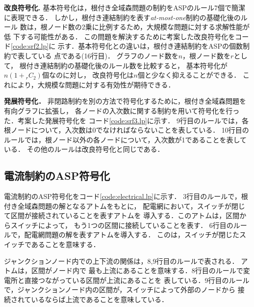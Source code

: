 \textbf{改良符号化.}
基本符号化は，根付き全域森問題の制約をASPのルール7個で簡潔に表現できる．
しかし，根付き連結制約を表す\textit{at-most-one}制約の基礎化後のルール
数は，根ノード数の2乗に比例するため，大規模な問題に対する求解性能が低
下する可能性がある．
%
この問題を解決するために考案した改良符号化をコード\ref{code:srf2.lp}に
示す．基本符号化との違いは，根付き連結制約をASPの個数制約で表している
点である(16行目)．
グラフのノード数を$n$，根ノード数を$r$として，
根付き連結制約の基礎化後のルール数を比較すると，
基本符号化が$n(1+{}_{r}C_{2})$個なのに対し，
改良符号化は$n$個と少なく抑えることができる．
これにより，大規模な問題に対する有効性が期待できる．
 
\textbf{発展符号化．}
非閉路制約を別の方法で符号化するために，根付き全域森問題を有向グラフに拡張し，
各ノードの入次数に関する制約を用いて符号化を行った．考案した発展符号化を
コード\ref{code:srf3.lp}に示す．
9行目のルールでは，各根ノードについて，入次数は0でなければならないことを表している．
10行目のルールでは，根ノード以外の各ノードについて，入次数が1であることを表している．
その他のルールは改良符号化と同じである．

\subsection{電流制約のASP符号化}



電流制約のASP符号化をコード\ref{code:electrical.lp}に示す．
3行目のルールで，根付き全域森問題の解となるアトムをもとに，
配電網において，スイッチが閉じて区間が接続されていることを表すアトムを
導入する．このアトムは，区間からスイッチによって，
もう1つの区間に接続していることを表す．
6行目のルールで，配電網問題の解を表すアトムを導入する．
このは，スイッチが閉じたスイッチであることを意味する．

ジャンクションノード内での上下流の関係は，8,9行目のルールで表される．
アトムは，区間がノード内で
最も上流にあることを意味する．8行目のルールで変電所と直接つながっている区間が上流にあることを
表している．9行目のルールで，ジャンクションノード内の区間が，スイッチによって外部のノードから
接続されているならば上流であることを意味している．

